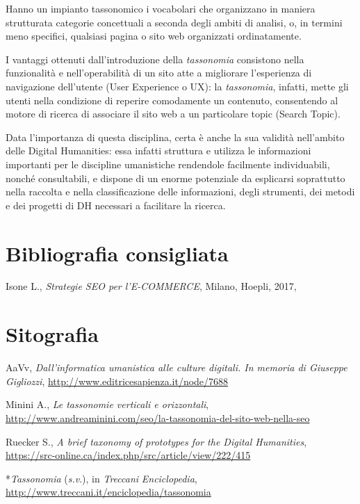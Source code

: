\documentclass[
  b5paper,
  twoside,
  12pt,
  chapterprefix=false,
  bibliography=totocnumbered,
  parskip=false]{scrbook}
\begin{document}
Hanno un impianto tassonomico i vocabolari che organizzano in maniera
strutturata categorie concettuali a seconda degli ambiti di analisi, o,
in termini meno specifici, qualsiasi pagina o sito web organizzati
ordinatamente.

I vantaggi ottenuti dall'introduzione della \emph{tassonomia} consistono
nella funzionalità e nell'operabilità di un sito atte a migliorare
l'esperienza di navigazione dell'utente (User Experience o UX): la
\emph{tassonomia}, infatti, mette gli utenti nella condizione di reperire
comodamente un contenuto, consentendo al motore di ricerca di associare
il sito web a un particolare topic (Search Topic).

Data l'importanza di questa disciplina, certa è anche la sua validità
nell'ambito delle Digital Humanities: essa infatti struttura e utilizza
le informazioni importanti per le discipline umanistiche rendendole
facilmente individuabili, nonché consultabili, e dispone di un enorme
potenziale da esplicarsi soprattutto nella raccolta e nella
classificazione delle informazioni, degli strumenti, dei metodi e dei
progetti di DH necessari a facilitare la ricerca.

\hypertarget{bibliografia-consigliata-24}{%
\section*{Bibliografia consigliata}\label{bibliografia-consigliata-24}}

Isone L., \emph{Strategie SEO per l'E-COMMERCE}, Milano, Hoepli, 2017,

\hypertarget{sitografia-31}{%
\section*{Sitografia}\label{sitografia-31}}

AaVv, \emph{Dall'informatica umanistica alle culture digitali. In memoria di
Giuseppe Gigliozzi},
\url{http://www.editricesapienza.it/node/7688}

Minini A., \emph{Le tassonomie verticali e orizzontali},
\url{http://www.andreaminini.com/seo/la-tassonomia-del-sito-web-nella-seo}

Ruecker S., \emph{A brief taxonomy of prototypes for the Digital Humanities},
\url{https://src-online.ca/index.php/src/article/view/222/415}

*\emph{Tassonomia} (\emph{s.v}.), in \emph{Treccani} \emph{Enciclopedia},
\url{http://www.treccani.it/enciclopedia/tassonomia}
\end{document}
